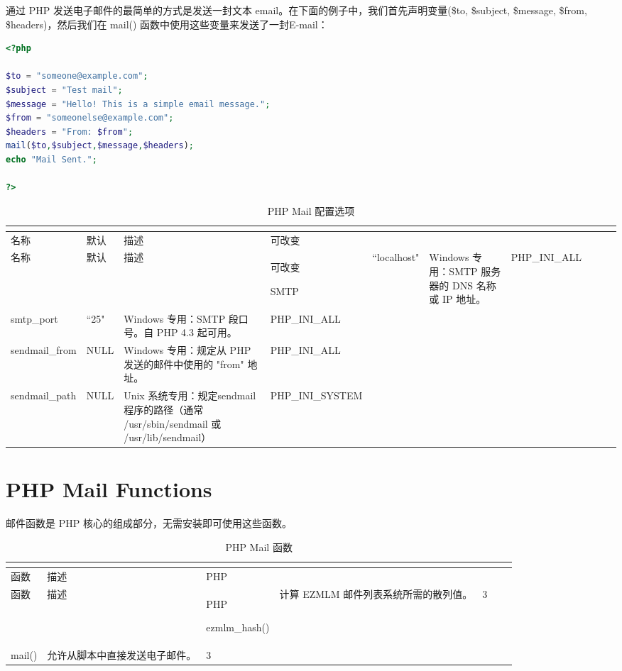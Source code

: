 通过 PHP 发送电子邮件的最简单的方式是发送一封文本 email。在下面的例子中，我们首先声明变量(\$to, \$subject, \$message, \$from, \$headers)，然后我们在 mail() 函数中使用这些变量来发送了一封E-mail：

\begin{lstlisting}[language=PHP]
<?php

$to = "someone@example.com";
$subject = "Test mail";
$message = "Hello! This is a simple email message.";
$from = "someonelse@example.com";
$headers = "From: $from";
mail($to,$subject,$message,$headers);
echo "Mail Sent.";

?>
\end{lstlisting}


\begin{longtable}{|m{60pt}|m{45pt}|m{190pt}|m{80pt}|}
\tabularnewline\hline
名称	&默认	&描述	&可改变
\endhead

\caption{PHP Mail 配置选项}\\
\hline
名称	&默认	&描述	&可改变
\endfirsthead

\endfoot

\endlastfoot

\hline
SMTP			&``localhost"	&Windows 专用：SMTP 服务器的 DNS 名称或 IP 地址。	&PHP\_INI\_ALL\\
\hline
smtp\_port		&``25"			&Windows 专用：SMTP 段口号。自 PHP 4.3 起可用。&PHP\_INI\_ALL\\
\hline
sendmail\_from	&NULL			&Windows 专用：规定从 PHP 发送的邮件中使用的 "from" 地址。&PHP\_INI\_ALL\\
\hline
sendmail\_path	&	NULL		&Unix 系统专用：规定sendmail 程序的路径（通常 /usr/sbin/sendmail 或 /usr/lib/sendmail）	&PHP\_INI\_SYSTEM\\
\hline
\end{longtable}


\section{PHP Mail Functions}

邮件函数是 PHP 核心的组成部分，无需安装即可使用这些函数。

\begin{longtable}{|m{120pt}|m{250pt}|m{20pt}|}
\tabularnewline\hline
函数	&描述	&PHP
\endhead

\caption{PHP Mail 函数}\\
\hline
函数	&描述	&PHP
\endfirsthead

\endfoot

\endlastfoot

\hline
ezmlm\_hash()	&计算 EZMLM 邮件列表系统所需的散列值。	&3\\
\hline
mail()			&允许从脚本中直接发送电子邮件。	&3\\
\hline
\end{longtable}

